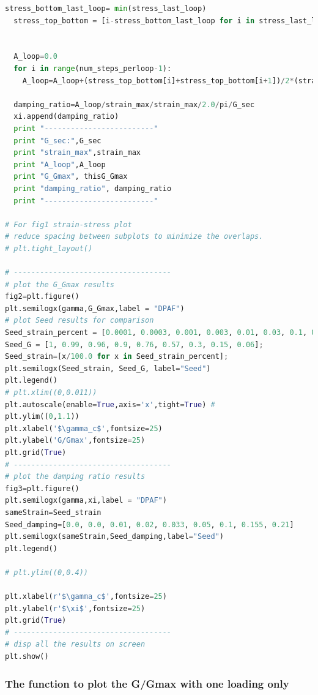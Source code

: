 \documentclass[fleqn,11pt]{article}
\begin{document}
\begin{lstlisting}[language=Python, frame=single]
  stress_bottom_last_loop= min(stress_last_loop)
  stress_top_bottom = [i-stress_bottom_last_loop for i in stress_last_loop]

  
  A_loop=0.0
  for i in range(num_steps_perloop-1):
    A_loop=A_loop+(stress_top_bottom[i]+stress_top_bottom[i+1])/2*(strain_last_loop[i+1]-strain_last_loop[i])
  
  damping_ratio=A_loop/strain_max/strain_max/2.0/pi/G_sec
  xi.append(damping_ratio)
  print "-------------------------"
  print "G_sec:",G_sec
  print "strain_max",strain_max
  print "A_loop",A_loop
  print "G_Gmax", thisG_Gmax
  print "damping_ratio", damping_ratio
  print "-------------------------"

# For fig1 strain-stress plot
# reduce spacing between subplots to minimize the overlaps.
# plt.tight_layout()

# ------------------------------------
# plot the G_Gmax results
fig2=plt.figure()
plt.semilogx(gamma,G_Gmax,label = "DPAF")
# plot Seed results for comparison
Seed_strain_percent = [0.0001, 0.0003, 0.001, 0.003, 0.01, 0.03, 0.1, 0.3, 1.0];
Seed_G = [1, 0.99, 0.96, 0.9, 0.76, 0.57, 0.3, 0.15, 0.06];
Seed_strain=[x/100.0 for x in Seed_strain_percent];
plt.semilogx(Seed_strain, Seed_G, label="Seed")
plt.legend()
# plt.xlim((0,0.011))
plt.autoscale(enable=True,axis='x',tight=True) #
plt.ylim((0,1.1))
plt.xlabel('$\gamma_c$',fontsize=25)
plt.ylabel('G/Gmax',fontsize=25)
plt.grid(True)
# ------------------------------------
# plot the damping ratio results 
fig3=plt.figure()
plt.semilogx(gamma,xi,label = "DPAF")
sameStrain=Seed_strain
Seed_damping=[0.0, 0.0, 0.01, 0.02, 0.033, 0.05, 0.1, 0.155, 0.21]
plt.semilogx(sameStrain,Seed_damping,label="Seed")
plt.legend()

# plt.ylim((0,0.4))

plt.xlabel(r'$\gamma_c$',fontsize=25)
plt.ylabel(r'$\xi$',fontsize=25)
plt.grid(True)
# ------------------------------------
# disp all the results on screen
plt.show()
\end{lstlisting}



\newpage
\subsubsection{The function to plot the G/Gmax with one loading only} ~
\end{document}
